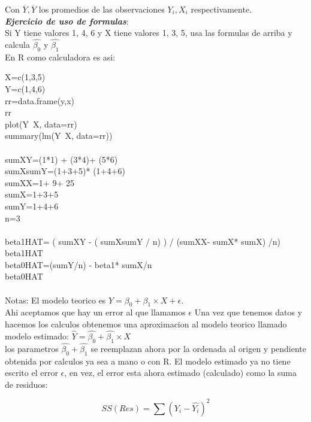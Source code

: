 \documentclass[letterpaper,11pt]{article}\usepackage[]{graphicx}\usepackage[]{color}
\begin{document}
Con $\overline{Y}, \overline{Y}$ los promedios de las observaciones $Y_{i}, X_{i}$	respectivamente.\\
\textbf{\textit{Ejercicio de uso de formulas}}:\\
	
Si Y tiene valores 1, 4, 6 y X tiene valores 1, 3, 5, usa las formulas de arriba y calcula $\hat{\beta_{0}}$ y $\hat{\beta_{1}}$ \\
En R como calculadora es asi:

X=c(1,3,5) \\
Y=c(1,4,6) \\
rr=data.frame(y,x) \\
rr \\
plot(Y~X, data=rr) \\
summary(lm(Y~X, data=rr)) \\ \\

sumXY=(1*1) + (3*4)+ (5*6) \\
sumXsumY=(1+3+5)* (1+4+6) \\
sumXX=1+ 9+ 25 \\
sumX=1+3+5 \\
sumY=1+4+6 \\
n=3 \\ \\

beta1HAT= ( sumXY - ( sumXsumY / n) ) / (sumXX- sumX* sumX) /n) \\
beta1HAT \\
beta0HAT=(sumY/n) - beta1* sumX/n \\
beta0HAT \\ \\

Notas:
El modelo teorico es $Y= \beta_{0} + \beta_{1} \times X + \epsilon$. \\Ahi aceptamos que hay un error al que llamamos $\epsilon$
Una vez que tenemos datos y hacemos los calculos obtenemos una aproximacion al modelo teorico llamado 
modelo estimado: $\hat{Y}= \hat{\beta_{0}} + \hat{\beta_{1}} \times X$ \\ 
los parametros $\hat{\beta_{0}} + \hat{\beta_{1}}$ se reemplazan ahora por la ordenada al origen y pendiente obtenida por
calculos ya sea a mano o con R. El modelo estimado ya no tiene escrito el error $\epsilon$,
en vez, el error esta ahora estimado (calculado) como la suma de residuos:  

	\begin{equation}
	SS(Res)= \sum(Y_{i}- \hat{Y_{i}})^2
	\end{equation}
	
\end{document}
